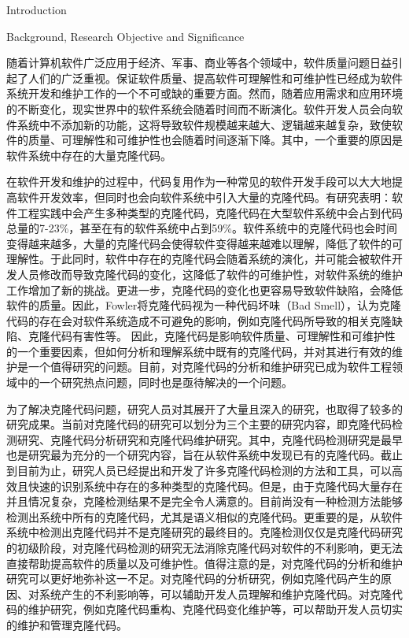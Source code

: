
{Introduction}

{Background, Research Objective and Significance}


随着计算机软件广泛应用于经济、军事、商业等各个领域中，软件质量问题日益引起了人们的广泛重视。保证软件质量、提高软件可理解性和可维护性已经成为软件系统开发和维护工作的一个不可或缺的重要方面。然而，随着应用需求和应用环境的不断变化，现实世界中的软件系统会随着时间而不断演化。软件开发人员会向软件系统中不添加新的功能，这将导致软件规模越来越大、逻辑越来越复杂，致使软件的质量、可理解性和可维护性也会随着时间逐渐下降。其中，一个重要的原因是软件系统中存在的大量克隆代码。

在软件开发和维护的过程中，代码复用作为一种常见的软件开发手段可以大大地提高软件开发效率，但同时也会向软件系统中引入大量的克隆代码。有研究表明：软件工程实践中会产生多种类型的克隆代码\cite{roy2007survey}，克隆代码在大型软件系统中会占到代码总量的7-23\%\cite{baker1995finding}\cite{kontogiannis1996pattern}\cite{lague1997assessing}，甚至在有的软件系统中占到59\%\cite{ducasse1999language}。软件系统中的克隆代码也会时间变得越来越多，大量的克隆代码会使得软件变得越来越难以理解，降低了软件的可理解性。于此同时，软件中存在的克隆代码会随着系统的演化，并可能会被软件开发人员修改而导致克隆代码的变化，这降低了软件的可维护性，对软件系统的维护工作增加了新的挑战。更进一步，克隆代码的变化也更容易导致软件缺陷，会降低软件的质量。因此，Fowler将克隆代码视为一种代码坏味（Bad Smell）\cite{fowler2009refactoring}，认为克隆代码的存在会对软件系统造成不可避免的影响，例如克隆代码所导致的相关克隆缺陷\cite{juergens2009code}\cite{gauthier2013uncovering}\cite{wagner2016relationship}、克隆代码有害性\cite{kapser2008cloning}\cite{selim2010studying}\cite{wang2012can}等。
因此，克隆代码是影响软件质量、可理解性和可维护性的一个重要因素，但如何分析和理解系统中既有的克隆代码，并对其进行有效的维护是一个值得研究的问题。目前，对克隆代码的分析和维护研究已成为软件工程领域中的一个研究热点问题，同时也是亟待解决的一个问题。

为了解决克隆代码问题，研究人员对其展开了大量且深入的研究，也取得了较多的研究成果。当前对克隆代码的研究可以划分为三个主要的研究内容，即克隆代码检测研究、克隆代码分析研究和克隆代码维护研究。其中，克隆代码检测研究是最早也是研究最为充分的一个研究内容，旨在从软件系统中发现已有的克隆代码。截止到目前为止，研究人员已经提出和开发了许多克隆代码检测的方法和工具\cite{roy2008nicad}\cite{kamiya2002ccfinder}\cite{jiang2007deckard}，可以高效且快速的识别系统中存在的多种类型的克隆代码。但是，由于克隆代码大量存在并且情况复杂，克隆检测结果不是完全令人满意的。目前尚没有一种检测方法能够检测出系统中所有的克隆代码，尤其是语义相似的克隆代码。更重要的是，从软件系统中检测出克隆代码并不是克隆研究的最终目的。克隆检测仅仅是克隆代码研究的初级阶段，对克隆代码检测的研究无法消除克隆代码对软件的不利影响，更无法直接帮助提高软件的质量以及可维护性。值得注意的是，对克隆代码的分析和维护研究可以更好地弥补这一不足。对克隆代码的分析研究，例如克隆代码产生的原因、对系统产生的不利影响等，可以辅助开发人员理解和维护克隆代码。对克隆代码的维护研究，例如克隆代码重构、克隆代码变化维护等，可以帮助开发人员切实的维护和管理克隆代码。

